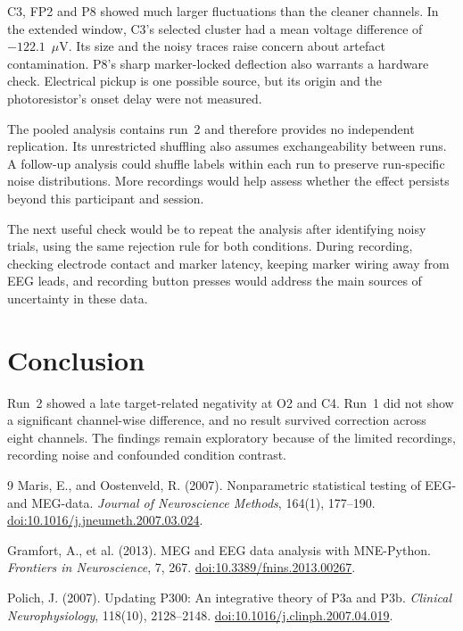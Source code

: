 \documentclass[11pt,a4paper]{article}
\newcommand{\uv}{\ensuremath{\mu\mathrm{V}}}
\begin{document}
C3, FP2 and P8 showed much larger fluctuations than the cleaner channels.
In the extended window, C3's selected cluster had a mean voltage difference
of $-122.1$~\uv. Its size and the noisy traces raise concern about artefact
contamination. P8's sharp marker-locked deflection also warrants a hardware
check. Electrical pickup is one possible source, but its origin and the
photoresistor's onset delay were not measured.

The pooled analysis contains run~2 and therefore provides no independent
replication. Its unrestricted shuffling also assumes exchangeability between
runs. A follow-up analysis could shuffle labels within each run to preserve
run-specific noise distributions. More recordings would help assess whether
the effect persists beyond this participant and session.

The next useful check would be to repeat the analysis after identifying noisy
trials, using the same rejection rule for both conditions. During recording,
checking electrode contact and marker latency, keeping marker wiring away
from EEG leads, and recording button presses would address the main sources
of uncertainty in these data.

\section{Conclusion}

Run~2 showed a late target-related negativity at O2 and C4. Run~1 did not
show a significant channel-wise difference, and no result survived correction
across eight channels. The findings remain exploratory because of the
limited recordings, recording noise and confounded condition contrast.

\begin{thebibliography}{9}
Maris, E., and Oostenveld, R. (2007).
Nonparametric statistical testing of EEG- and MEG-data.
\emph{Journal of Neuroscience Methods}, 164(1), 177--190.
\href{https://doi.org/10.1016/j.jneumeth.2007.03.024}{doi:10.1016/j.jneumeth.2007.03.024}.

Gramfort, A., et al. (2013).
MEG and EEG data analysis with MNE-Python.
\emph{Frontiers in Neuroscience}, 7, 267.
\href{https://doi.org/10.3389/fnins.2013.00267}{doi:10.3389/fnins.2013.00267}.

Polich, J. (2007).
Updating P300: An integrative theory of P3a and P3b.
\emph{Clinical Neurophysiology}, 118(10), 2128--2148.
\href{https://doi.org/10.1016/j.clinph.2007.04.019}{doi:10.1016/j.clinph.2007.04.019}.
\end{thebibliography}
\end{document}
